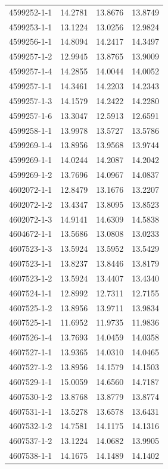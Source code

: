 \begin{longtable}{lrrr}
4599252-1-1 & 14.2781 & 13.8676 & 13.8749 \\
4599253-1-1 & 13.1224 & 13.0256 & 12.9824 \\
4599256-1-1 & 14.8094 & 14.2417 & 14.3497 \\
4599257-1-2 & 12.9945 & 13.8765 & 13.9009 \\
4599257-1-4 & 14.2855 & 14.0044 & 14.0052 \\
4599257-1-1 & 14.3461 & 14.2203 & 14.2343 \\
4599257-1-3 & 14.1579 & 14.2422 & 14.2280 \\
4599257-1-6 & 13.3047 & 12.5913 & 12.6591 \\
4599258-1-1 & 13.9978 & 13.5727 & 13.5786 \\
4599269-1-4 & 13.8956 & 13.9568 & 13.9744 \\
4599269-1-1 & 14.0244 & 14.2087 & 14.2042 \\
4599269-1-2 & 13.7696 & 14.0967 & 14.0837 \\
4602072-1-1 & 12.8479 & 13.1676 & 13.2207 \\
4602072-1-2 & 13.4347 & 13.8095 & 13.8523 \\
4602072-1-3 & 14.9141 & 14.6309 & 14.5838 \\
4604672-1-1 & 13.5686 & 13.0808 & 13.0233 \\
4607523-1-3 & 13.5924 & 13.5952 & 13.5429 \\
4607523-1-1 & 13.8237 & 13.8446 & 13.8179 \\
4607523-1-2 & 13.5924 & 13.4407 & 13.4340 \\
4607524-1-1 & 12.8992 & 12.7311 & 12.7155 \\
4607525-1-2 & 13.8956 & 13.9711 & 13.9834 \\
4607525-1-1 & 11.6952 & 11.9735 & 11.9836 \\
4607526-1-4 & 13.7693 & 14.0459 & 14.0358 \\
4607527-1-1 & 13.9365 & 14.0310 & 14.0465 \\
4607527-1-2 & 13.8956 & 14.1579 & 14.1503 \\
4607529-1-1 & 15.0059 & 14.6560 & 14.7187 \\
4607530-1-2 & 13.8768 & 13.8779 & 13.8774 \\
4607531-1-1 & 13.5278 & 13.6578 & 13.6431 \\
4607532-1-2 & 14.7581 & 14.1175 & 14.1316 \\
4607537-1-2 & 13.1224 & 14.0682 & 13.9905 \\
4607538-1-1 & 14.1675 & 14.1489 & 14.1402 \\

\end{longtable}
